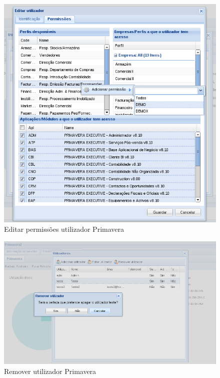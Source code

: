 \begin{figure}[H]
    \begin{center}
    \includegraphics[scale=0.38]{screenshots/primavera/primavera_edit_user_permissions.png}
    \caption{Editar permissões utilizador Primavera}
    \label{fig:primavera_edit_user}
    \end{center}
\end{figure}

\begin{figure}[H]
    \begin{center}
    \includegraphics[scale=0.38]{screenshots/primavera/primaverainterface_10.png}
    \caption{Remover utilizador Primavera}
    \label{fig:primavera_delete_user}
    \end{center}
\end{figure}


